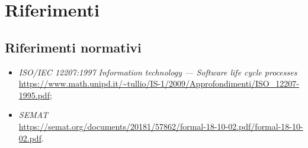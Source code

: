 \documentclass[10pt, a4paper]{article}
\begin{document}
\section{Riferimenti}
    \subsection{Riferimenti normativi}
    \begin{itemize}
        \item \textit{ISO/IEC 12207:1997 Information technology — Software life cycle processes}\\
        \url{https://www.math.unipd.it/~tullio/IS-1/2009/Approfondimenti/ISO_12207-1995.pdf};
        \item \textit{SEMAT}\\
        \url{https://semat.org/documents/20181/57862/formal-18-10-02.pdf/formal-18-10-02.pdf}.
    \end{itemize}
\end{document}
